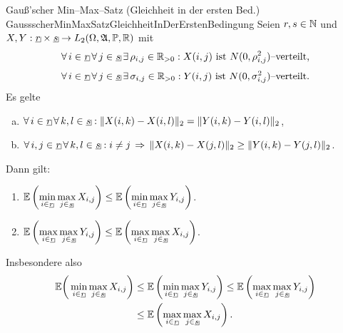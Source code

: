 \begin{korollar}
  {Gauß'scher Min--Max--Satz (Gleichheit in der ersten Bed.)}
  {GaussscherMinMaxSatzGleichheitInDerErstenBedingung}
Seien $r, s \in \mathbb{N}$ und 
$X, Y: \haken r \times \haken s \rightarrow L_2(\Omega, \mfa, \Prim, \R)$
mit 
\[\forall\,i\in\haken r\,\forall\,j\in\haken s\,\exists\,\rho_{i,j}\in\R_{>0}:
X(i, j) \text{ ist }N(0, \rho_{i,j}^2)\text{--verteilt,}\]
\[
\forall\,i\in\haken r\,\forall\,j\in\haken s\,
\exists\,\sigma_{i,j}\in\R_{>0}:
Y(i, j) \text{ ist }N(0, \sigma_{i,j}^2)\text{--verteilt.}\]
Es gelte
\begin{enumerate}[(a)]
	\item $\forall\, i \in \haken r \, \forall\, k,l \in \haken s:
	\norm{X(i,k)-X(i,l)}_2 = \norm{Y(i,k)-Y(i,l)}_2$,
	\item $\forall\, i, j \in \haken r\,\forall\, k, l \in \haken s:
i \neq j \folgt \norm{X(i,k)-X(j,l)}_2 \ge \norm{Y(i,k)-Y(j,l)}_2$.
\end{enumerate}
Dann gilt:
\begin{enumerate}[(1)]
	\item\label{GaussscherMinMaxSatzGleichheitInDerErstenBedingung1}
	$\E\left(\underset{{i \in \haken r}}\min\,
	         \underset{{j \in \haken s}}\max \,X_{i,j} \right)
	\le \E\left(\underset{{i \in \haken r}}\min\,
	         \underset{{j \in \haken s}}\max \,Y_{i,j} \right)$.
	\item\label{GaussscherMinMaxSatzGleichheitInDerErstenBedingung2}
	$\E\left(\underset{{i \in \haken r}}\max\,
	         \underset{{j \in \haken s}}\max \,Y_{i,j} \right)
  \le\E\left(\underset{{i \in \haken r}}\max\,
	         \underset{{j \in \haken s}}\max \,X_{i,j} \right)$.
\end{enumerate}
Insbesondere also
\begin{align*}
\E\bigg(\min_{i \in \haken r}\max_{j \in \haken s}X_{i,j} \bigg)
&\le\E\left(\min_{i \in \haken r}\max_{j \in \haken s}Y_{i,j} \right)
\le\E\left(\max_{i \in \haken r}\max_{j \in \haken s}Y_{i,j} \right)\\
&\le\E\left(\max_{i \in \haken r}\max_{j \in \haken s}X_{i,j} \right)\text.
\end{align*}
\end{korollar}
